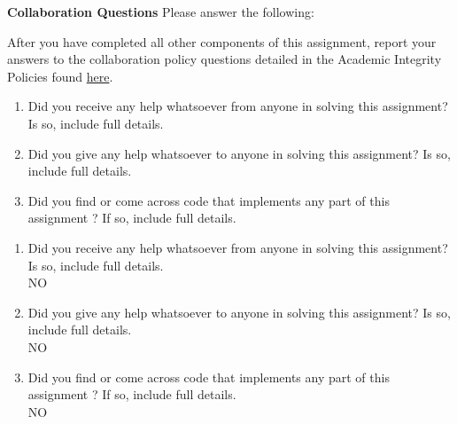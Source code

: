 \documentclass[11pt,addpoints,answers]{exam}
\numberwithin{equation}{section} %
\numberwithin{figure}{section} %
\numberwithin{table}{section} %
\begin{document}
\textbf{Collaboration Questions} Please answer the following:


    After you have completed all other components of this assignment, report your answers to the collaboration policy questions detailed in the Academic Integrity Policies found \href{http://www.cs.cmu.edu/~mgormley/courses/10601/about.html#7-academic-integrity-policies}{here}.
    \begin{enumerate}
        \item Did you receive any help whatsoever from anyone in solving this assignment? Is so, include full details.
        \item Did you give any help whatsoever to anyone in solving this assignment? Is so, include full details.
        \item Did you find or come across code that implements any part of this assignment ? If so, include full details.
    \end{enumerate}
    
    \begin{solution}
 \begin{enumerate}
        \item Did you receive any help whatsoever from anyone in solving this assignment? Is so, include full details. \\
		NO
        \item Did you give any help whatsoever to anyone in solving this assignment? Is so, include full details. \\ NO
        \item Did you find or come across code that implements any part of this assignment ? If so, include full details. \\ NO
    \end{enumerate}

    \end{solution}
    
\end{document}
